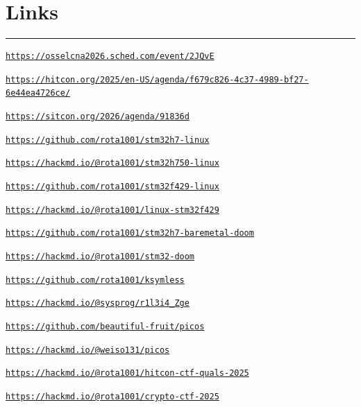 \documentclass[11pt]{article}
\begin{document}
\section*{Links}
\vspace{-9pt}\noindent\rule{\linewidth}{0.6pt}\vspace{2pt}
\begin{enumerate}[label={[\arabic*]},left=0pt,topsep=1pt,itemsep=1pt,parsep=0pt]
  \item \hypertarget{l1}{\href{https://osselcna2026.sched.com/event/2JQvE}{\nolinkurl{https://osselcna2026.sched.com/event/2JQvE}}}
  \item \hypertarget{l2}{\href{https://hitcon.org/2025/en-US/agenda/f679c826-4c37-4989-bf27-6e44ea4726ce/}{\nolinkurl{https://hitcon.org/2025/en-US/agenda/f679c826-4c37-4989-bf27-6e44ea4726ce/}}}
  \item \hypertarget{l3}{\href{https://sitcon.org/2026/agenda/91836d}{\nolinkurl{https://sitcon.org/2026/agenda/91836d}}}
  \item \hypertarget{l4}{\href{https://github.com/rota1001/stm32h7-linux}{\nolinkurl{https://github.com/rota1001/stm32h7-linux}}}
  \item \hypertarget{l5}{\href{https://hackmd.io/@rota1001/stm32h750-linux}{\nolinkurl{https://hackmd.io/@rota1001/stm32h750-linux}}}
  \item \hypertarget{l6}{\href{https://github.com/rota1001/stm32f429-linux}{\nolinkurl{https://github.com/rota1001/stm32f429-linux}}}
  \item \hypertarget{l7}{\href{https://hackmd.io/@rota1001/linux-stm32f429}{\nolinkurl{https://hackmd.io/@rota1001/linux-stm32f429}}}
  \item \hypertarget{l8}{\href{https://github.com/rota1001/stm32h7-baremetal-doom}{\nolinkurl{https://github.com/rota1001/stm32h7-baremetal-doom}}}
  \item \hypertarget{l9}{\href{https://hackmd.io/@rota1001/stm32-doom}{\nolinkurl{https://hackmd.io/@rota1001/stm32-doom}}}
  \item \hypertarget{l10}{\href{https://github.com/rota1001/ksymless}{\nolinkurl{https://github.com/rota1001/ksymless}}}
  \item \hypertarget{l11}{\href{https://hackmd.io/@sysprog/r1l3i4_Zge}{\nolinkurl{https://hackmd.io/@sysprog/r1l3i4_Zge}}}
  \item \hypertarget{l12}{\href{https://github.com/beautiful-fruit/picos}{\nolinkurl{https://github.com/beautiful-fruit/picos}}}
  \item \hypertarget{l13}{\href{https://hackmd.io/@weiso131/picos}{\nolinkurl{https://hackmd.io/@weiso131/picos}}}
  \item \hypertarget{l14}{\href{https://hackmd.io/@rota1001/hitcon-ctf-quals-2025}{\nolinkurl{https://hackmd.io/@rota1001/hitcon-ctf-quals-2025}}}
  \item \hypertarget{l15}{\href{https://hackmd.io/@rota1001/crypto-ctf-2025}{\nolinkurl{https://hackmd.io/@rota1001/crypto-ctf-2025}}}
\end{enumerate}
\end{document}

